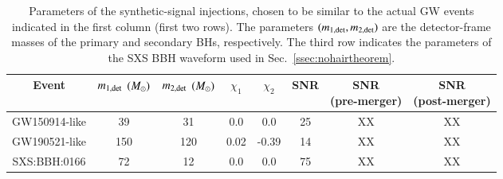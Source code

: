 \begin{table}[h!]
\begin{center}
\begin{tabular}{ |c|c|c|c|c|c|c|c| }
 \hline
 Event & \makecell{$m_{\rm 1,det}$ \\ $(M_{\odot})$} &  \makecell{$m_{\rm 2,det}$ \\ $(M_{\odot})$} & $\chi_{1}$ & $\chi_{2}$ & SNR & \makecell{SNR \\ (pre-merger)} & \makecell{SNR \\(post-merger)} \\
 \hline
 GW150914-like & 39 & 31 & 0.0 & 0.0 & 25 & XX & XX \\
 GW190521-like & 150 & 120 & 0.02 & -0.39 & 14 & XX & XX \\
 SXS:BBH:0166 & 72 & 12  & 0.0 & 0.0 & 75 & XX & XX \\
 \hline
\end{tabular}
\caption{Parameters of the synthetic-signal injections, chosen to be similar to the actual GW events indicated in the first column (first two rows). The parameters $(m_{\rm 1,det},m_{\rm 2,det})$ are the detector-frame masses of the primary and secondary BHs, respectively. The third row indicates the parameters of the SXS BBH waveform used in Sec.~\ref{ssec:nohairtheorem}. }
\label{tab:injection_values}
\end{center}
\end{table}
